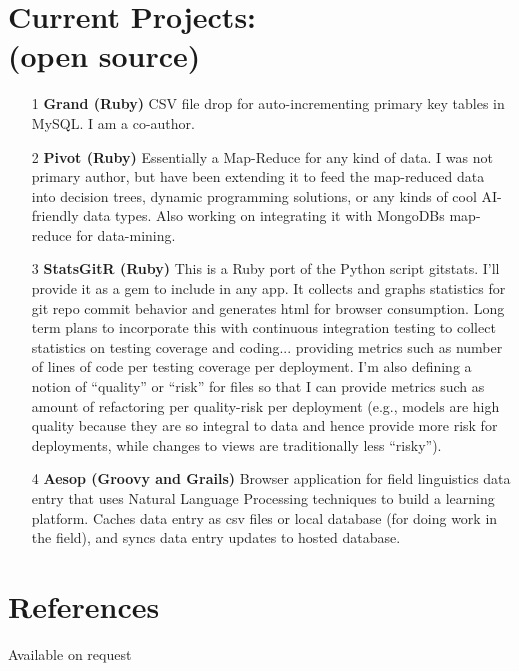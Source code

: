 \documentclass[margin,line]{resume}
\begin{document}
\begin{resume}
\section{Current Projects:\\ \small(open source)}
		\begin{itemize}
		\item[1] {\bf Grand (Ruby)} {\small CSV file drop for auto-incrementing primary key tables in MySQL. I am a co-author.}
		\item[2] {\bf Pivot (Ruby)} {\small Essentially a Map-Reduce for any kind of data. I was not primary author, but have been extending it to feed the map-reduced data into decision trees, dynamic programming solutions, or any kinds of cool AI-friendly data types. Also working on integrating it with MongoDBs map-reduce for data-mining.}
		\item[3] {\bf StatsGitR (Ruby)} {\small This is a Ruby port of the Python script gitstats. I'll provide it as a gem to include in any app. It collects and graphs statistics for git repo commit behavior and generates html for browser consumption. Long term plans to incorporate this with continuous integration testing to collect statistics on testing coverage and coding... providing metrics such as number of lines of code per testing coverage per deployment. I'm also defining a notion of ``quality'' or ``risk'' for files so that I can provide metrics such as amount of refactoring per quality-risk per deployment (e.g., models are high quality because they are so integral to data and hence provide more risk for deployments, while changes to views are traditionally less ``risky'').} 
		\item[4] {\bf Aesop (Groovy and Grails)} {\small Browser application for field linguistics data entry that uses Natural Language Processing techniques to build a learning platform. Caches data entry as csv files or local database (for doing work in the field), and syncs data entry updates to hosted database.}
		\end{itemize}
%
%


\section{References}
Available on request
\end{resume}
\end{document}
